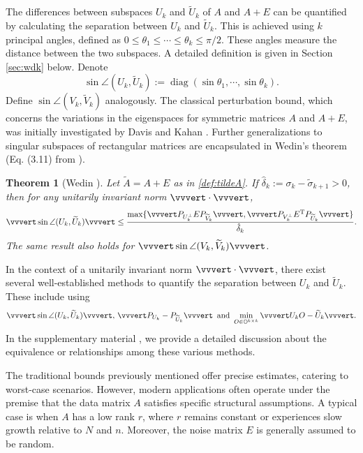 \documentclass[reqno]{amsart}
\DeclareMathOperator{\diag}{diag}
\newcommand{\T}{\mathrm{T}}
\theoremstyle{plain}
\newtheorem{theorem}{Theorem}
\theoremstyle{definition}
\begin{document}
The differences between subspaces $U_k$ and $\widetilde U_k$ of $A$ and $A+E$ can be quantified by calculating the separation between $U_k$ and $\widetilde U_k$. This is achieved using $k$ principal angles, defined as $0\le \theta_1\le \cdots \le \theta_k\le {\pi}/{2}$. These angles measure the distance between the two subspaces. A detailed definition is given in Section \ref{sec:wdk} below. Denote  
$$\sin\angle(U_k, \widetilde U_k) := \diag(\sin\theta_1, \cdots , \sin\theta_k).$$ Define $\sin\angle(V_k, \widetilde V_k)$ analogously. The classical perturbation bound, which concerns the variations in the eigenspaces for symmetric matrices $A$ and $A+E$, was initially investigated by Davis and Kahan \cite{DK}. Further generalizations to singular subspaces of rectangular matrices are encapsulated in Wedin's theorem (Eq. (3.11) from \cite{Wedin}).
\begin{theorem}[Wedin \cite{Wedin}] \label{thm:wedin}  Let $\widetilde{A} = A + E$ as in \eqref{def:tildeA}. If $\hat\delta_k:=\sigma_k- \widetilde\sigma_{k+1}>0$, then for any unitarily invariant norm $\vvvert \cdot \vvvert$,
\begin{equation}\label{eq:wedin}
\vvvert \sin\angle(U_k, \widetilde U_k) \vvvert  \le \frac{\max\{\vvvert P_{{U}_k^\perp} E P_{\widetilde{V}_k} \vvvert, \vvvert  P_{{V}_k^\perp} E^\T P_{ \widetilde{U}_k} \vvvert \}}{\hat\delta_k}.
\end{equation}
The same result also holds for $\vvvert \sin\angle(V_k, \widetilde V_k) \vvvert$.
\end{theorem}

In the context of a unitarily invariant norm $\vvvert \cdot \vvvert$, there exist several well-established methods to quantify the separation between $U_k$ and $\widetilde U_k$. These include using $$\vvvert \sin\angle(U_k, \widetilde U_k) \vvvert, \, \vvvert P_{U_k} - P_{\widetilde U_k}\vvvert \,\text{ and } \min_{O\in \mathbb{O}^{k\times k}} \vvvert U_kO- \widetilde U_k\vvvert.$$ In  the supplementary material \cite{WangSupp24}, we provide a detailed discussion about the equivalence or relationships among these various methods. 

The traditional bounds previously mentioned offer precise estimates, catering to worst-case scenarios. However, modern applications often operate under the premise that the data matrix $A$ satisfies specific structural assumptions. A typical case is when $A$ has a low rank $r$, where $r$ remains constant or experiences slow growth relative to $N$ and $n$. Moreover, the noise matrix $E$ is generally assumed to be random.
\end{document}
